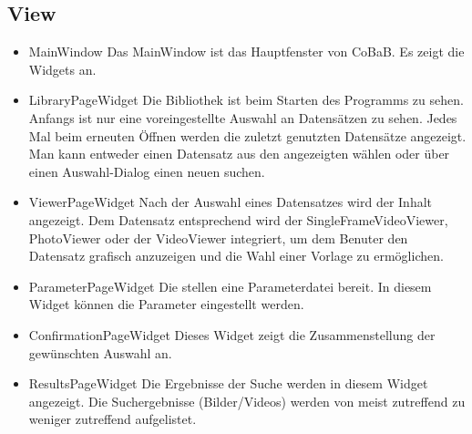 \subsection*{View}
\begin{itemize}
\item MainWindow \newline
Das MainWindow ist das Hauptfenster von CoBaB. Es zeigt die Widgets an.

\item LibraryPageWidget \newline
Die Bibliothek ist beim Starten des Programms zu sehen. Anfangs ist nur eine voreingestellte Auswahl an Datensätzen zu sehen. Jedes Mal beim erneuten Öffnen werden die zuletzt genutzten Datensätze angezeigt. Man kann entweder einen Datensatz aus den angezeigten wählen oder über einen Auswahl-Dialog einen neuen suchen.
\pagebreak
\item ViewerPageWidget \newline
Nach der Auswahl eines Datensatzes wird der Inhalt angezeigt. Dem Datensatz entsprechend wird der SingleFrameVideoViewer, PhotoViewer oder der VideoViewer integriert, um dem Benuter den Datensatz grafisch anzuzeigen und die Wahl einer Vorlage zu ermöglichen.

\item ParameterPageWidget \newline
Die  stellen eine Parameterdatei bereit. In diesem Widget können die Parameter eingestellt werden.

\item ConfirmationPageWidget \newline 
Dieses Widget zeigt die Zusammenstellung der gewünschten Auswahl an.

\item ResultsPageWidget \newline
Die Ergebnisse der Suche werden in diesem Widget angezeigt. Die Suchergebnisse (Bilder/Videos) werden von meist zutreffend zu weniger zutreffend aufgelistet. 

\end{itemize}
